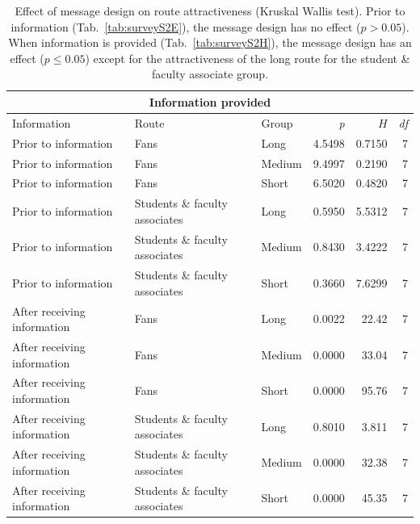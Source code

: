 \begin{table}[H]
\centering
\begin{tabular}{lllrrr}
\multicolumn{6}{c}{\textbf{Information provided}}\\                                                                                                                                         

  \hline
Information & Route & Group & \textit{p} & $H$ & \textit{df} \\ 
  \hline
Prior to information &  Fans & Long &   4.5498 &      0.7150 &     7 \\ 
Prior to information &   Fans & Medium &    9.4997 &      0.2190  &     7 \\ 
Prior to information &   Fans & Short &   6.5020 &     0.4820 &     7 \\ 
Prior to information &   Students \& faculty associates & Long &          0.5950  & 5.5312 & 7 \\ 
Prior to information &   Students \& faculty associates & Medium &        0.8430 &  3.4222 & 7\\ 
Prior to information &   Students \& faculty associates & Short &         0.3660 &  7.6299 & 7 \\ 
  \hline 
After receiving information &      Fans & Long & 0.0022 & 22.42 &     7 \\ 
After receiving information &  Fans & Medium & 0.0000 & 33.04 &     7 \\ 
After receiving information &    Fans & Short & 0.0000 & 95.76 &     7 \\ 
After receiving information &  Students \& faculty associates & Long & 0.8010 & 3.811 &     7 \\ 
After receiving information &   Students \& faculty associates & Medium & 0.0000 & 32.38 &     7 \\ 
After receiving information &    Students \& faculty associates & Short& 0.0000 & 45.35 &     7 \\ 
\hline   
\end{tabular}
\caption{ Effect of message design on route attractiveness (Kruskal Wallis test). Prior to information (Tab.~\ref{tab:surveyS2E}), the message design has no effect ($p>0.05$). When information is provided (Tab.~\ref{tab:surveyS2H}), the message design has an effect ($p\leq0.05$) except for the attractiveness of the long route for the student \& faculty associate group.}
\label{tab:surveyS2G}
\end{table}

